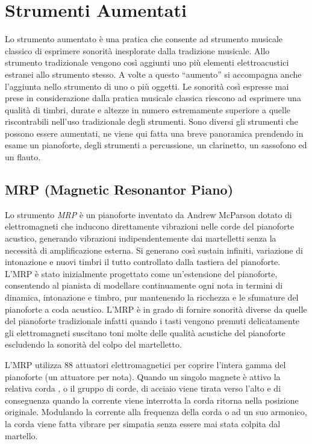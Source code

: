 
\chapter{Strumenti Aumentati}
\label{chp:strumentiaumentati}

Lo strumento aumentato  è una pratica che consente  ad strumento musicale classico di esprimere sonorità inesplorate dalla tradizione musicale.
Allo strumento tradizionale vengono così aggiunti uno più elementi elettroacustici estranei allo strumento stesso. A volte a questo “aumento” si accompagna anche l’aggiunta nello strumento di uno o più oggetti.
Le sonorità così espresse mai prese in considerazione dalla pratica musicale classica riescono ad esprimere una qualità di timbri, durate e altezze in numero estremamente superiore a quelle riscontrabili nell’uso tradizionale degli strumenti.
Sono diversi gli strumenti che possono essere aumentati, ne viene qui fatta una breve panoramica prendendo in esame un pianoforte, degli strumenti a percussione, un clarinetto, un sassofono ed un flauto.

\section{MRP (Magnetic Resonantor Piano)}

Lo strumento \emph{MRP} è un pianoforte inventato da Andrew McParson dotato di elettromagneti  che inducono direttamente vibrazioni nelle corde del pianoforte acustico, generando vibrazioni indipendentemente dai martelletti senza la necessità di amplificazione esterna.
Si generano così sustain infiniti, variazione di intonazione e nuovi timbri il tutto controllato dalla tastiera del pianoforte.
L'MRP è stato inizialmente progettato come un'estensione del pianoforte, consentendo al pianista di modellare continuamente ogni nota in termini di dinamica, intonazione e timbro, pur mantenendo la ricchezza e le sfumature del pianoforte a coda acustico.
L'MRP è in grado di fornire sonorità diverse da quelle del pianoforte tradizionale infatti quando i tasti vengono premuti delicatamente gli elettromagneti suscitano toni molte delle qualità acustiche del pianoforte escludendo la sonorità del colpo del martelletto.

L'MRP utilizza 88 attuatori elettromagnetici per coprire l'intera gamma del pianoforte (un attuatore per nota). 
Quando un singolo magnete è attivo la relativa corda , o il gruppo di corde, di acciaio viene tirata verso l’alto e di conseguenza quando la corrente viene interrotta la  corda ritorna nella posizione originale.
Modulando la corrente alla frequenza della corda o ad un suo armonico, la corda viene fatta vibrare per simpatia senza essere mai stata colpita dal martello.


